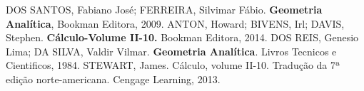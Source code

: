 \begin{thebibliography}{99}


 DOS SANTOS, Fabiano José; FERREIRA, Silvimar Fábio.  \textbf{Geometria Analítica},  Bookman Editora, 2009.
 ANTON, Howard; BIVENS, Irl; DAVIS, Stephen. \textbf{Cálculo-Volume II-10.} Bookman Editora, 2014.
 DOS REIS, Genesio Lima; DA SILVA, Valdir Vilmar. \textbf{Geometria Analítica}. Livros Tecnicos e Cientificos, 1984.
 STEWART, James. Cálculo, volume II-10. Tradução da 7ª edição norte-americana. Cengage Learning, 2013.
\end{thebibliography}